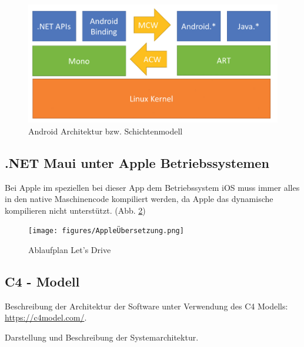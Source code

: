 \begin{figure}[H]
	\centering
	\includegraphics[width=\textwidth,height=\textheight,keepaspectratio]{figures/AndroidArchitektur.png}
	\caption{Android Architektur bzw. Schichtenmodell}
	\label{fig:AndroidArchitektur}
\end{figure}

\subsection{.NET Maui unter Apple Betriebssystemen}
Bei Apple im speziellen bei dieser App dem Betriebssystem iOS muss immer alles in den native Maschinencode kompiliert werden, da Apple das dynamische kompilieren nicht unterstützt. (Abb. \ref{fig:AppleÜbersetzung})

\begin{figure}[H]
	\centering
	\texttt{[image: figures/AppleÜbersetzung.png]}
	\caption{Ablaufplan Let's Drive}
	\label{fig:AppleÜbersetzung}
\end{figure}







\subsection{C4 - Modell}

Beschreibung der Architektur der Software unter Verwendung des C4 Modells: \url{https://c4model.com/}.

Darstellung und Beschreibung der Systemarchitektur.

